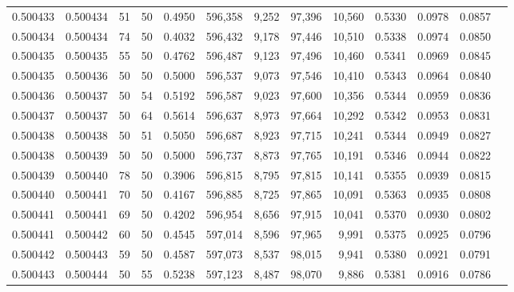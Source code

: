 \begin{tabular}{rrrrrrrrrrrrr}
0.500433 & 0.500434 &    51 &  50 &                                     0.4950 & 596,358 &   9,252 &  97,396 &  10,560 & 0.5330 & 0.0978 & 0.0857 \\
0.500434 & 0.500434 &    74 &  50 &                                     0.4032 & 596,432 &   9,178 &  97,446 &  10,510 & 0.5338 & 0.0974 & 0.0850 \\
0.500435 & 0.500435 &    55 &  50 &                                     0.4762 & 596,487 &   9,123 &  97,496 &  10,460 & 0.5341 & 0.0969 & 0.0845 \\
0.500435 & 0.500436 &    50 &  50 &                                     0.5000 & 596,537 &   9,073 &  97,546 &  10,410 & 0.5343 & 0.0964 & 0.0840 \\
0.500436 & 0.500437 &    50 &  54 &                                     0.5192 & 596,587 &   9,023 &  97,600 &  10,356 & 0.5344 & 0.0959 & 0.0836 \\
0.500437 & 0.500437 &    50 &  64 &                                     0.5614 & 596,637 &   8,973 &  97,664 &  10,292 & 0.5342 & 0.0953 & 0.0831 \\
0.500438 & 0.500438 &    50 &  51 &                                     0.5050 & 596,687 &   8,923 &  97,715 &  10,241 & 0.5344 & 0.0949 & 0.0827 \\
0.500438 & 0.500439 &    50 &  50 &                                     0.5000 & 596,737 &   8,873 &  97,765 &  10,191 & 0.5346 & 0.0944 & 0.0822 \\
0.500439 & 0.500440 &    78 &  50 &                                     0.3906 & 596,815 &   8,795 &  97,815 &  10,141 & 0.5355 & 0.0939 & 0.0815 \\
0.500440 & 0.500441 &    70 &  50 &                                     0.4167 & 596,885 &   8,725 &  97,865 &  10,091 & 0.5363 & 0.0935 & 0.0808 \\
0.500441 & 0.500441 &    69 &  50 &                                     0.4202 & 596,954 &   8,656 &  97,915 &  10,041 & 0.5370 & 0.0930 & 0.0802 \\
0.500441 & 0.500442 &    60 &  50 &                                     0.4545 & 597,014 &   8,596 &  97,965 &   9,991 & 0.5375 & 0.0925 & 0.0796 \\
0.500442 & 0.500443 &    59 &  50 &                                     0.4587 & 597,073 &   8,537 &  98,015 &   9,941 & 0.5380 & 0.0921 & 0.0791 \\
0.500443 & 0.500444 &    50 &  55 &                                     0.5238 & 597,123 &   8,487 &  98,070 &   9,886 & 0.5381 & 0.0916 & 0.0786 \\

\end{tabular}
